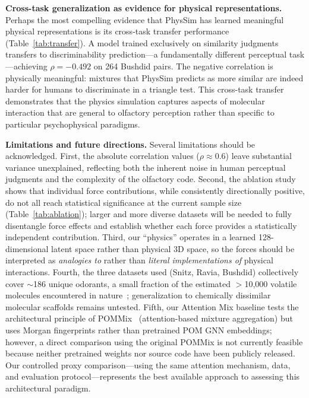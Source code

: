 \documentclass[11pt,a4paper]{article}
\begin{document}
\textbf{Cross-task generalization as evidence for physical representations.} Perhaps the most compelling evidence that PhysSim has learned meaningful physical representations is its cross-task transfer performance (Table~\ref{tab:transfer}). A model trained exclusively on similarity judgments transfers to discriminability prediction---a fundamentally different perceptual task---achieving $\rho = -0.492$ on 264 Bushdid pairs. The negative correlation is physically meaningful: mixtures that PhysSim predicts as more similar are indeed harder for humans to discriminate in a triangle test. This cross-task transfer demonstrates that the physics simulation captures aspects of molecular interaction that are general to olfactory perception rather than specific to particular psychophysical paradigms.

\textbf{Limitations and future directions.} Several limitations should be acknowledged. First, the absolute correlation values ($\rho \approx 0.6$) leave substantial variance unexplained, reflecting both the inherent noise in human perceptual judgments and the complexity of the olfactory code. Second, the ablation study shows that individual force contributions, while consistently directionally positive, do not all reach statistical significance at the current sample size (Table~\ref{tab:ablation}); larger and more diverse datasets will be needed to fully disentangle force effects and establish whether each force provides a statistically independent contribution. Third, our ``physics'' operates in a learned 128-dimensional latent space rather than physical 3D space, so the forces should be interpreted as \emph{analogies to} rather than \emph{literal implementations of} physical interactions. Fourth, the three datasets used (Snitz, Ravia, Bushdid) collectively cover $\sim$186 unique odorants, a small fraction of the estimated $>$10,000 volatile molecules encountered in nature~\cite{sell2006}; generalization to chemically dissimilar molecular scaffolds remains untested. Fifth, our Attention Mix baseline tests the architectural principle of POMMix~\cite{nguyen2025pommix} (attention-based mixture aggregation) but uses Morgan fingerprints rather than pretrained POM GNN embeddings; however, a direct comparison using the original POMMix is not currently feasible because neither pretrained weights nor source code have been publicly released. Our controlled proxy comparison---using the same attention mechanism, data, and evaluation protocol---represents the best available approach to assessing this architectural paradigm.
\end{document}
